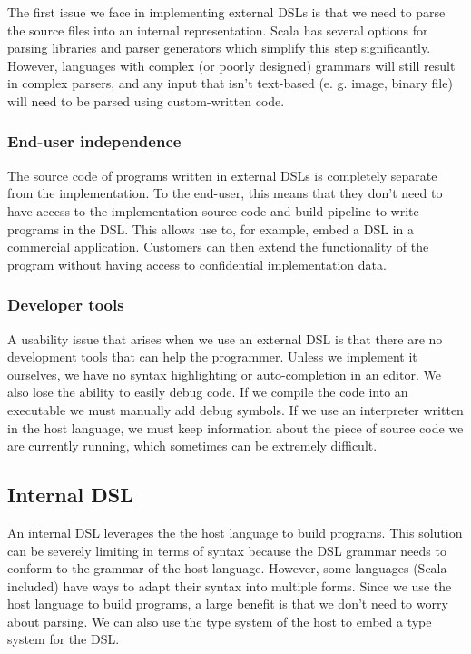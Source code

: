 The first issue we face in implementing external DSLs is that we need to parse the source files into an internal representation. Scala has several options for parsing libraries and parser generators which simplify this step significantly. However, languages with complex (or poorly designed) grammars will still result in complex parsers, and any input that isn't text-based (e. g. image, binary file) will need to be parsed using custom-written code.

\subsubsection{End-user independence}

The source code of programs written in external DSLs is completely separate from the implementation. To the end-user, this means that they don't need to have access to the implementation source code and build pipeline to write programs in the DSL. This allows use to, for example, embed a DSL in a commercial application. Customers can then extend the functionality of the program without having access to confidential implementation data.

\subsubsection{Developer tools}

A usability issue that arises when we use an external DSL is that there are no development tools that can help the programmer. Unless we implement it ourselves, we have no syntax highlighting or auto-completion in an editor. We also lose the ability to easily debug code. If we compile the code into an executable we must manually add debug symbols. If we use an interpreter written in the host language, we must keep information about the piece of source code we are currently running, which sometimes can be extremely difficult.

\subsection{Internal DSL}

An internal DSL leverages the the host language to build programs. This solution can be severely limiting in terms of syntax because the DSL grammar needs to conform to the grammar of the host language. However, some languages (Scala included) have ways to adapt their syntax into multiple forms. Since we use the host language to build programs, a large benefit is that we don't need to worry about parsing. We can also use the type system of the host to embed a type system for the DSL.

